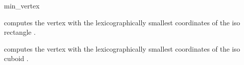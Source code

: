 \begin{ccRefFunction}{min_vertex}

 {computes the vertex with the lexicographically smallest coordinates of the iso rectangle .}

 {computes the vertex with the lexicographically smallest coordinates of the iso cuboid .}

\end{ccRefFunction}

